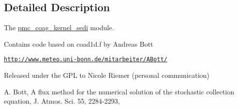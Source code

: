 \subsection{Detailed Description}
The \mbox{\hyperlink{namespacepmc__coag__kernel__sedi}{pmc\+\_\+coag\+\_\+kernel\+\_\+sedi}} module. 

Contains code based on {\ttfamily coad1d.\+f} by Andreas Bott
\begin{DoxyItemize}
\item \href{http://www.meteo.uni-bonn.de/mitarbeiter/ABott/}{\tt http\+://www.\+meteo.\+uni-\/bonn.\+de/mitarbeiter/\+A\+Bott/}
\item Released under the G\+PL to Nicole Riemer (personal communication)
\item A. Bott, A flux method for the numerical solution of the stochastic collection equation, J. Atmos. Sci. 55, 2284-\/2293,
\begin{DoxyEnumerate}
\item 
\end{DoxyEnumerate}
\end{DoxyItemize}